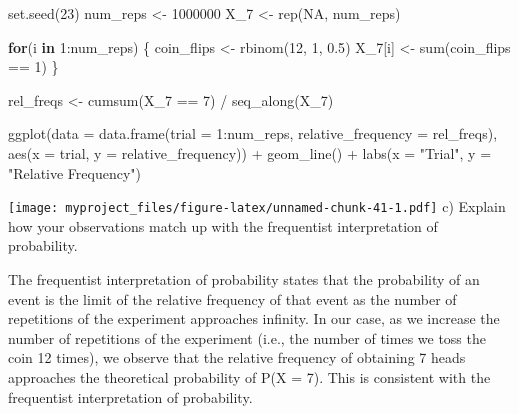 \documentclass[
]{article}
\newenvironment{Shaded}{\begin{snugshade}}{\end{snugshade}}
\newcommand{\AttributeTok}[1]{\textcolor[rgb]{0.77,0.63,0.00}{#1}}
\newcommand{\ConstantTok}[1]{\textcolor[rgb]{0.00,0.00,0.00}{#1}}
\newcommand{\ControlFlowTok}[1]{\textcolor[rgb]{0.13,0.29,0.53}{\textbf{#1}}}
\newcommand{\DecValTok}[1]{\textcolor[rgb]{0.00,0.00,0.81}{#1}}
\newcommand{\FloatTok}[1]{\textcolor[rgb]{0.00,0.00,0.81}{#1}}
\newcommand{\FunctionTok}[1]{\textcolor[rgb]{0.00,0.00,0.00}{#1}}
\newcommand{\NormalTok}[1]{#1}
\newcommand{\OtherTok}[1]{\textcolor[rgb]{0.56,0.35,0.01}{#1}}
\newcommand{\SpecialCharTok}[1]{\textcolor[rgb]{0.00,0.00,0.00}{#1}}
\newcommand{\StringTok}[1]{\textcolor[rgb]{0.31,0.60,0.02}{#1}}
\begin{document}
\begin{Shaded}
\begin{Highlighting}[]
\FunctionTok{set.seed}\NormalTok{(}\DecValTok{23}\NormalTok{)}
\NormalTok{num\_reps }\OtherTok{\textless{}{-}} \DecValTok{1000000}
\NormalTok{X\_7 }\OtherTok{\textless{}{-}} \FunctionTok{rep}\NormalTok{(}\ConstantTok{NA}\NormalTok{, num\_reps)}

\ControlFlowTok{for}\NormalTok{(i }\ControlFlowTok{in} \DecValTok{1}\SpecialCharTok{:}\NormalTok{num\_reps) \{}
\NormalTok{  coin\_flips }\OtherTok{\textless{}{-}} \FunctionTok{rbinom}\NormalTok{(}\DecValTok{12}\NormalTok{, }\DecValTok{1}\NormalTok{, }\FloatTok{0.5}\NormalTok{)}
\NormalTok{  X\_7[i] }\OtherTok{\textless{}{-}} \FunctionTok{sum}\NormalTok{(coin\_flips }\SpecialCharTok{==} \DecValTok{1}\NormalTok{)}
\NormalTok{\}}

\NormalTok{rel\_freqs }\OtherTok{\textless{}{-}} \FunctionTok{cumsum}\NormalTok{(X\_7 }\SpecialCharTok{==} \DecValTok{7}\NormalTok{) }\SpecialCharTok{/} \FunctionTok{seq\_along}\NormalTok{(X\_7)}

\FunctionTok{ggplot}\NormalTok{(}\AttributeTok{data =} \FunctionTok{data.frame}\NormalTok{(}\AttributeTok{trial =} \DecValTok{1}\SpecialCharTok{:}\NormalTok{num\_reps, }\AttributeTok{relative\_frequency =}\NormalTok{ rel\_freqs), }\FunctionTok{aes}\NormalTok{(}\AttributeTok{x =}\NormalTok{ trial, }\AttributeTok{y =}\NormalTok{ relative\_frequency)) }\SpecialCharTok{+}
  \FunctionTok{geom\_line}\NormalTok{() }\SpecialCharTok{+}
  \FunctionTok{labs}\NormalTok{(}\AttributeTok{x =} \StringTok{"Trial"}\NormalTok{, }\AttributeTok{y =} \StringTok{"Relative Frequency"}\NormalTok{)}
\end{Highlighting}
\end{Shaded}

\texttt{[image: myproject\_files/figure-latex/unnamed-chunk-41-1.pdf]} c)
Explain how your observations match up with the frequentist
interpretation of probability.

The frequentist interpretation of probability states that the
probability of an event is the limit of the relative frequency of that
event as the number of repetitions of the experiment approaches
infinity. In our case, as we increase the number of repetitions of the
experiment (i.e., the number of times we toss the coin 12 times), we
observe that the relative frequency of obtaining 7 heads approaches the
theoretical probability of P(X = 7). This is consistent with the
frequentist interpretation of probability.
\end{document}
